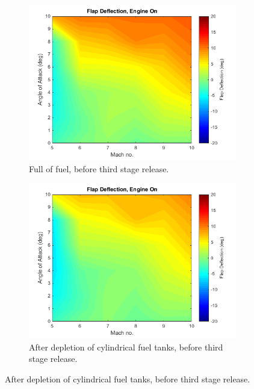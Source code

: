 		
		\begin{figure}
			\begin{subfigure}{.5\textwidth}
				\centering
				\includegraphics[width=0.99\linewidth]{figures/3_vehicle_design/FlapEngineCG1}
				\caption{Full of fuel, before third stage release.}
			\end{subfigure}
			\begin{subfigure}{.5\textwidth}
				\centering
				\includegraphics[width=0.99\linewidth]{figures/3_vehicle_design/FlapEngineCG2}
				\caption{After depletion of cylindrical fuel tanks, before third stage release.}
				

\end{subfigure}
\end{figure}
